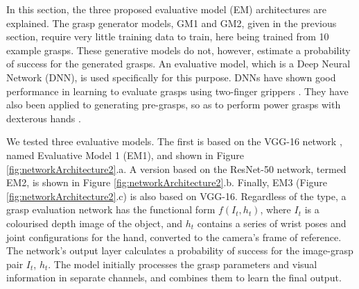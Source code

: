 In this section, the three proposed evaluative model (EM) architectures are explained. The grasp generator models, GM1 and GM2, given in the previous section, require very little training data to train, here being trained from 10 example grasps. %
These generative models do not, however, estimate a probability of success for the generated grasps. An evaluative model, which is a Deep Neural Network (DNN), is used specifically for this purpose. DNNs have shown good performance in learning to evaluate grasps using two-finger grippers \cite{levine16,lenz2015deep}. They have also been applied to generating pre-grasps, so as to perform power grasps with dexterous hands \cite{varley2015generating,lu2017planning}.


We tested three evaluative models. The first is based on the VGG-16 network \cite{Simonyan14c}, named Evaluative Model 1 (EM1), and shown in Figure \ref{fig:networkArchitecture2}.a. A version based on the ResNet-50 network, termed EM2, is shown in Figure \ref{fig:networkArchitecture2}.b. Finally, EM3 (Figure \ref{fig:networkArchitecture2}.c) is also based on VGG-16. Regardless of the type, a grasp evaluation network has the functional form $f(I_t, h_t)$, where $I_t$ is a colourised depth image of the object, and $h_t$ contains a series of wrist poses and joint configurations for the hand, converted to the camera's frame of reference. The network's output layer calculates a probability of success for the image-grasp pair $I_t$, $h_t$. The model initially processes the grasp parameters and visual information in separate channels, and combines them to learn the final output. 

